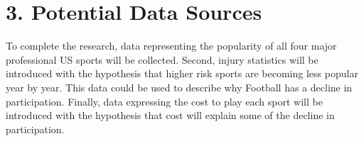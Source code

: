 \documentclass[
]{article}
\begin{document}
\hypertarget{potential-data-sources}{%
\section{3. Potential Data Sources}\label{potential-data-sources}}

To complete the research, data representing the popularity of all four
major professional US sports will be collected. Second, injury
statistics will be introduced with the hypothesis that higher risk
sports are becoming less popular year by year. This data could be used
to describe why Football has a decline in participation. Finally, data
expressing the cost to play each sport will be introduced with the
hypothesis that cost will explain some of the decline in participation.
\end{document}
